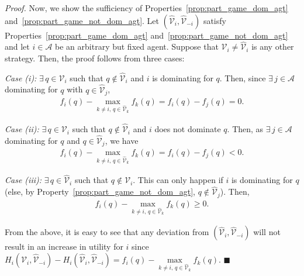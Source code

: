 \documentclass{IEEEtran}
\newcommand{\Mcal}[1]{\mathcal{#1}}
\newcommand{\squaresym}{\hbox{$\blacksquare$}}
\newcommand{\proofend}{\relax\ifmmode\else\unskip\hfill\fi\squaresym}
\renewenvironment{proof}{\textit{Proof.} }{\proofend}
\renewcommand{\hat}[1]{\widehat{#1}}
\newcommand{\marginn}[1]{\marginpar{\color{blue}\tiny\ttfamily#1}}
\newcommand{\margin}[1]{\marginpar{\color{magenta}\tiny\ttfamily#1}}
\def \agt{\Mcal{A}}
\def \alloc{\Mcal{V}}
\def \alloch{\hat{\alloc}}
\begin{document}
\begin{proof}
Now, we show the sufficiency of Properties~\ref{prop:part_game_dom_agt} and~\ref{prop:part_game_not_dom_agt}. Let $(\alloch_i,\alloch_{-i})$ satisfy Properties~\ref{prop:part_game_dom_agt} and~\ref{prop:part_game_not_dom_agt} and let $i \in \agt$ be an arbitrary but fixed agent. Suppose that $\alloc_i 
\neq \alloch_i$ is any other strategy. Then, 
 the proof follows from  three cases:

  \emph{Case (i):} $\exists \, q \in \alloc_i$ 
such that $q \notin \alloch_i$ and $i$ is  dominating for $q$. Then, since $\exists \, j \in \agt$ 
dominating for $q$ with $q \in \alloch_j$, %
\begin{align*}
  f_i(q) - \max_{k \neq i, \, q \in \alloch_k} f_k(q) = f_i(q) - f_j(q) = 0. 
\end{align*}

\emph{Case (ii):} $\exists \,q \in \alloc_i$ such that
$q \notin \alloch_i$ and $i$ does not dominate $q$. Then, as
$\exists \, j \in \agt$ dominating for $q$ and $q \in \alloch_j$, we
have
\begin{align*}
	f_i(q) - \max_{k \neq i, \, q \in \alloch_k} f_k(q) = f_i(q) - f_j(q) < 0.
\end{align*}

\emph{Case (iii):} $\exists \,q \in \alloch_i$ such that
$q \notin \alloc_i$. This can only happen if $i$ is dominating for $q$
(else, by Property~\ref{prop:part_game_not_dom_agt}, $q \notin \alloch_j$).
Then, %
\begin{align*}
  f_i(q) - \max_{k \neq i, \, q \in \alloch_k} f_k(q) \geq 0.
\end{align*}

From the above, it is easy to see that any deviation from $(\alloch_i,\alloch_{-i})$ 
will not result in an increase in utility for $i$ since $H_i(\alloc_i,\alloch_{-i}) - H_i(\alloch_i,\alloch_{-i}) = f_i(q) - \max\limits_{k \neq i, \, q \in \alloch_k} f_k(q)$.
\end{proof}
\end{document}
